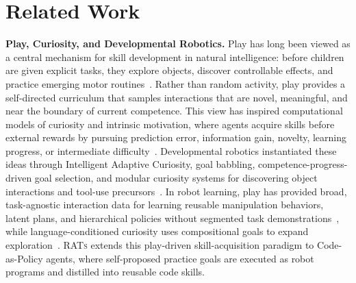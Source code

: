 
\section{Related Work}
\label{sec:related}

\textbf{Play, Curiosity, and Developmental Robotics.}
Play has long been viewed as a central mechanism for skill development in natural intelligence: before children are given explicit tasks, they explore objects, discover controllable effects, and practice emerging motor routines~\citep{piaget1952origins, vygotsky1978mind, pellegrini2009role, gopnik2020childhood}. Rather than random activity, play provides a self-directed curriculum that samples interactions that are novel, meaningful, and near the boundary of current competence. This view has inspired computational models of curiosity and intrinsic motivation, where agents acquire skills before external rewards by pursuing prediction error, information gain, novelty, learning progress, or intermediate difficulty~\citep{schmidhuber1991curious, schmidhuber2010formal, houthooft2016vime, oudeyer2007intrinsic, kaplan2007intrinsic, kidd2012goldilocks}. Developmental robotics instantiated these ideas through Intelligent Adaptive Curiosity, goal babbling, competence-progress-driven goal selection, and modular curiosity systems for discovering object interactions and tool-use precursors~\citep{rolf2010goal, baranes2013active, forestier2016modular, forestier2017intrinsically}. In robot learning, play has provided broad, task-agnostic interaction data for learning reusable manipulation behaviors, latent plans, and hierarchical policies without segmented task demonstrations~\citep{lynch2020learning, wang2023mimicplay}, while language-conditioned curiosity uses compositional goals to expand exploration~\citep{colas2020language}. \textsc{RATs} extends this play-driven skill-acquisition paradigm to Code-as-Policy agents, where self-proposed practice goals are executed as robot programs and distilled into reusable code skills.

